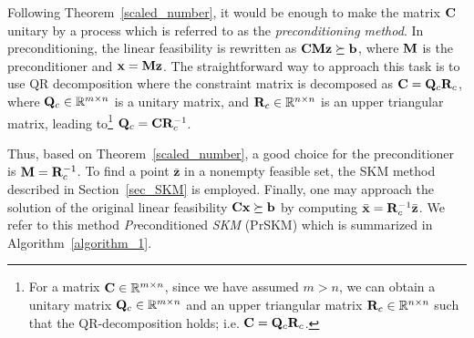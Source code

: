 \documentclass[12pt,draftcls,onecolumn]{IEEEtran}
\begin{document}
Following Theorem~\ref{scaled_number}, it would be enough to make the matrix $\mathbf{C}$ unitary by a process which is referred to as the \emph{preconditioning method}. In preconditioning, the linear feasibility is rewritten as $\mathbf{C} \mathbf{M} \mathbf{z}\succeq\mathbf{b}$,
where $\mathbf{M}$ is the preconditioner and $\mathbf{x}=\mathbf{M} \mathbf{z}$. The straightforward way to approach this task is to use QR decomposition where the constraint matrix is decomposed as $\mathbf{C}=\mathbf{Q}_{c}\mathbf{R}_{c}$, where $\mathbf{Q}_{c}\in\mathbb{R}^{m\times n}$ is a unitary matrix, and $\mathbf{R}_{c}\in\mathbb{R}^{n\times n}$ is an upper triangular matrix, leading to\footnote{For a matrix $\mathbf{C}\in\mathbb{R}^{m\times n}$, since we have assumed $m>n$, we can obtain a unitary matrix $\mathbf{Q}_{c}\in\mathbb{R}^{m\times n}$ and an upper triangular matrix $\mathbf{R}_{c}\in\mathbb{R}^{n\times n}$ such that the QR-decomposition holds; i.e. $\mathbf{C}=\mathbf{Q}_{c}\mathbf{R}_{c}$.} $\mathbf{Q}_{c}=\mathbf{C}\mathbf{R}^{-1}_{c}$.

Thus, based on Theorem~\ref{scaled_number}, a good choice for the preconditioner is $\mathbf{M}=\mathbf{R}^{-1}_{c}$. To find a
point $\bar{\mathbf{z}}$ in a nonempty feasible set,
the SKM method described in Section~\ref{sec_SKM} is employed.
Finally, one may approach the solution of the original linear feasibility $\mathbf{C}\mathbf{x}\succeq\mathbf{b}$ by computing $\bar{\mathbf{x}}=\mathbf{R}^{-1}_{c}\bar{\mathbf{z}}$.
We refer to this method \emph{Pr}econditioned \emph{SKM} (PrSKM) which is summarized in Algorithm~\ref{algorithm_1}.
\end{document}
